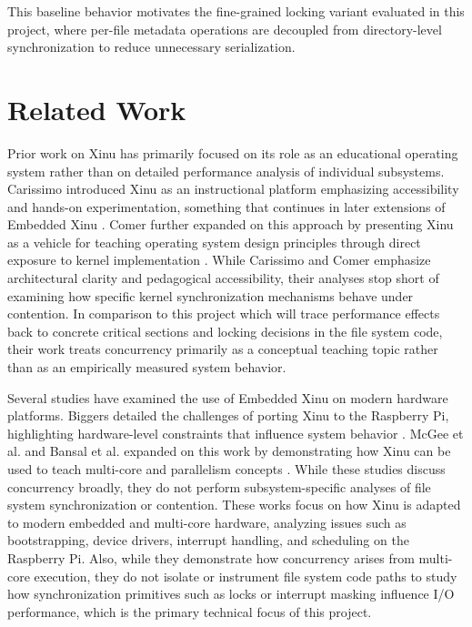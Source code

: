 \documentclass[sigconf]{acmart}
\begin{document}
This baseline behavior motivates the fine-grained locking variant evaluated in this project, where per-file metadata operations are decoupled from directory-level synchronization to reduce unnecessary serialization.






\section{Related Work}
\label{sec:relatedwork}

Prior work on Xinu has primarily focused on its role as an educational operating system rather than on detailed performance analysis of individual subsystems. Carissimo introduced Xinu as an instructional platform emphasizing accessibility and hands-on experimentation, something that continues in later extensions of Embedded Xinu \cite{Carissimo1995XINUanET}. Comer further expanded on this approach by presenting Xinu as a vehicle for teaching operating system design principles through direct exposure to kernel implementation \cite{Beich2016OperatingSD}. While Carissimo and Comer emphasize architectural clarity and pedagogical accessibility, their analyses stop short of examining how specific kernel synchronization mechanisms behave under contention. In comparison to this project which will trace performance effects back to concrete critical sections and locking decisions in the file system code, their work treats concurrency primarily as a conceptual teaching topic rather than as an empirically measured system behavior.

Several studies have examined the use of Embedded Xinu on modern hardware platforms. Biggers detailed the challenges of porting Xinu to the Raspberry Pi, highlighting hardware-level constraints that influence system behavior \cite{Biggers2014PortingTE}. McGee et al. and Bansal et al. expanded on this work by demonstrating how Xinu can be used to teach multi-core and parallelism concepts \cite{McGee2020UsingEX, Bansal2017XinuPi3TM}. While these studies discuss concurrency broadly, they do not perform subsystem-specific analyses of file system synchronization or contention. These works focus on how Xinu is adapted to modern embedded and multi-core hardware, analyzing issues such as bootstrapping, device drivers, interrupt handling, and scheduling on the Raspberry Pi. Also, while they demonstrate how concurrency arises from multi-core execution, they do not isolate or instrument file system code paths to study how synchronization primitives such as locks or interrupt masking influence I/O performance, which is the primary technical focus of this project.
\end{document}
